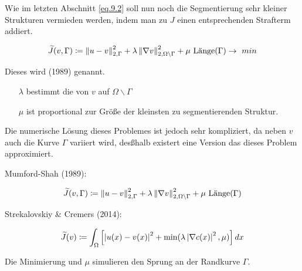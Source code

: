 Wie im letzten Abschnitt \ref{eq.9.2} soll nun noch die Segmentierung sehr kleiner Strukturen vermieden werden, indem man zu $J$ einen entsprechenden Strafterm addiert.

\begin{equation*}
\widetilde J(v,\Gamma)  \coloneqq  \norm{u-v}_{2,\Gamma}^2 + \lambda \norm{\nabla v}_{2,\Omega \backslash \Gamma}^2 + \mu \ \text{Länge}(\Gamma) \to \ min
\end{equation*}

Dieses wird  (1989) genannt.

\begin{enumerate}
\item[$\lambda$] bestimmt die  von $v$ auf $\Omega \backslash \Gamma$
\item[$\mu$] ist proportional zur Größe der kleinsten zu segmentierenden Struktur.
\end{enumerate}

Die numerische Lösung dieses Problemes ist jedoch sehr kompliziert, da neben $v$ auch die Kurve $\Gamma$ variiert wird, desßhalb existert eine  Version das dieses Problem approximiert.

Mumford-Shah (1989):

\[\widetilde J(v,\Gamma)  \coloneqq  \norm{u-v}_{2,\Gamma}^2 + \lambda \norm{\nabla v}_{2,\Omega \backslash \Gamma}^2 + \mu \ \text{Länge}(\Gamma)\]

Strekalovskiy \& Cremers (2014):

\[\widetilde J(v)  \coloneqq  \int_\Omega \left[ \left| u(x) - v(x) \right|^2 + \text{min}(\lambda \left| \nabla c(x) \right|^2, \mu) \right] dx \]

Die Minimierung und $\mu$ simulieren den Sprung an der Randkurve $\Gamma$.
